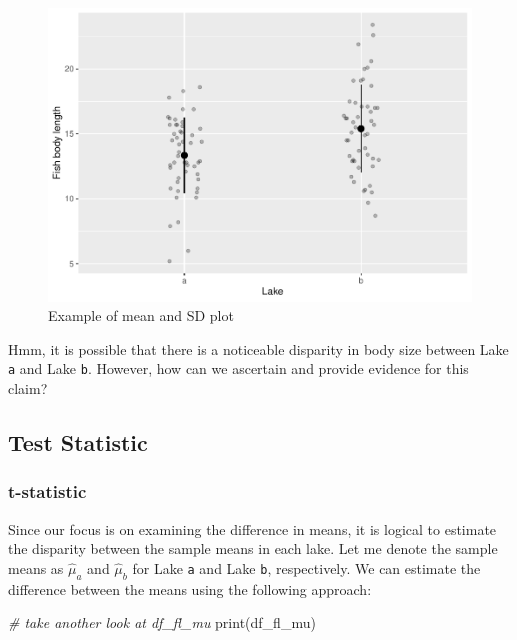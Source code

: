 \documentclass[
]{article}
\newenvironment{Shaded}{\begin{snugshade}}{\end{snugshade}}
\newcommand{\CommentTok}[1]{\textcolor[rgb]{0.56,0.35,0.01}{\textit{#1}}}
\newcommand{\FunctionTok}[1]{\textcolor[rgb]{0.00,0.00,0.00}{#1}}
\newcommand{\NormalTok}[1]{#1}
\begin{document}
\begin{figure}

{\centering \includegraphics{biostats_files/figure-latex/mean-plot-1} 

}

\caption{Example of mean and SD plot}\label{fig:mean-plot}
\end{figure}

Hmm, it is possible that there is a noticeable disparity in body size between Lake \texttt{a} and Lake \texttt{b}. However, how can we ascertain and provide evidence for this claim?

\hypertarget{test-statistic}{%
\subsection{Test Statistic}\label{test-statistic}}

\hypertarget{t-statistic}{%
\subsubsection{t-statistic}\label{t-statistic}}

Since our focus is on examining the difference in means, it is logical to estimate the disparity between the sample means in each lake. Let me denote the sample means as \(\hat{\mu}_a\) and \(\hat{\mu}_b\) for Lake \texttt{a} and Lake \texttt{b}, respectively. We can estimate the difference between the means using the following approach:

\begin{Shaded}
\begin{Highlighting}[]
\CommentTok{\# take another look at df\_fl\_mu}
\FunctionTok{print}\NormalTok{(df\_fl\_mu)}
\end{Highlighting}
\end{Shaded}
\end{document}
